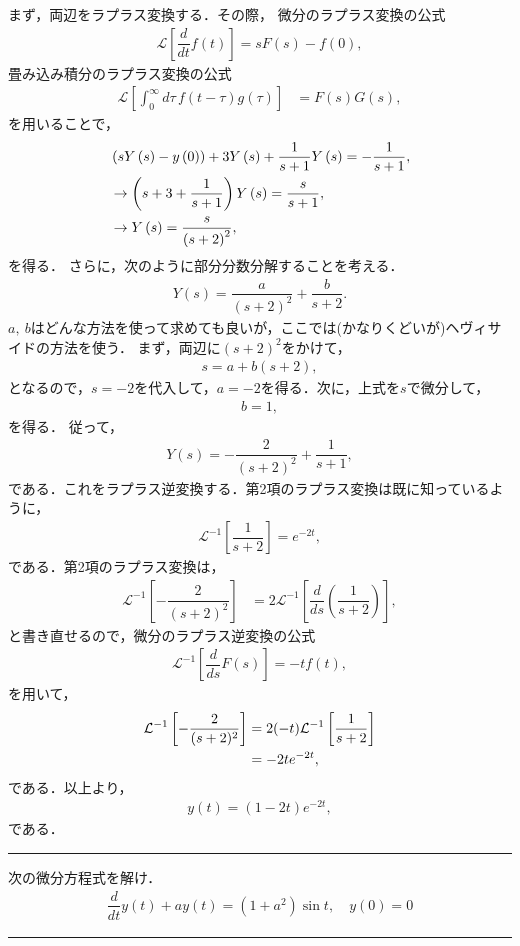 まず，両辺をラプラス変換する．その際，
微分のラプラス変換の公式
\begin{align}
  \mathcal{L}\left[\dfrac{d}{dt}f(t)\right] = sF(s) - f(0), 
\end{align}
畳み込み積分のラプラス変換の公式
\begin{align}
  \mathcal{L}\left[\int_{0}^{\infty}d\tau\,f\left(t-\tau\right)g\left(\tau\right)\right] & =F\left(s\right)G\left(s\right),
\end{align}
を用いることで，
\begin{align}
 & \left(sY\left(s\right)-y\left(0\right)\right)+3Y\left(s\right)+\dfrac{1}{s+1}Y\left(s\right)=-\dfrac{1}{s+1},\notag\\
 & \rightarrow\left(s+3+\dfrac{1}{s+1}\right)Y\left(s\right)=\dfrac{s}{s+1},\notag\\
 & \rightarrow Y\left(s\right)=\dfrac{s}{\left(s+2\right)^{2}},
\end{align}
を得る．
さらに，次のように部分分数分解することを考える．
\begin{align}
 Y(s) = \dfrac{a}{(s+2)^2} + \dfrac{b}{s+2}. 
\end{align}
$a,~b$はどんな方法を使って求めても良いが，ここでは(かなりくどいが)ヘヴィサイドの方法を使う．
まず，両辺に$(s+2)^2$をかけて，
\begin{align}
  s = a + b(s+2), 
\end{align}
となるので，$s=-2$を代入して，$a=-2$を得る．次に，上式を$s$で微分して，
\begin{align}
  b = 1, 
\end{align}
を得る．
従って，
\begin{align}
 Y(s) = -\dfrac{2}{(s+2)^2} + \dfrac{1}{s+1}, 
\end{align}
である．これをラプラス逆変換する．第2項のラプラス変換は既に知っているように，
\begin{align}
 \mathcal{L}^{-1}\left[\dfrac{1}{s+2}\right] = e^{-2t}, 
\end{align}
である．第2項のラプラス変換は，
\begin{align}
 \mathcal{L}^{-1}\left[-\dfrac{2}{(s+2)^2}\right] 
 &= 2\mathcal{L}^{-1}\left[\dfrac{d}{ds}\left(\dfrac{1}{s+2}\right)\right],
\end{align}
と書き直せるので，微分のラプラス逆変換の公式
\begin{align}
 \mathcal{L}^{-1}\left[\dfrac{d}{ds}F(s)\right] = -tf(t), 
\end{align}
を用いて，
\begin{align}
 \mathcal{L}^{-1}\left[-\dfrac{2}{(s+2)^2}\right] 
 &= 2(-t)\mathcal{L}^{-1}\left[\dfrac{1}{s+2}\right] \notag \\
 &= -2te^{-2t},
\end{align}
である．以上より，
\begin{align}
  y(t) = (1-2t)e^{-2t},
\end{align}
である．
%
\newpage
%
\hrule
\reidai
次の微分方程式を解け．
\begin{align}
 \dfrac{d}{dt}y(t) + a y (t) = (1+a^2)\sin t, \quad y(0) = 0 
\end{align}
\hrule
\vspace*{.2cm}

